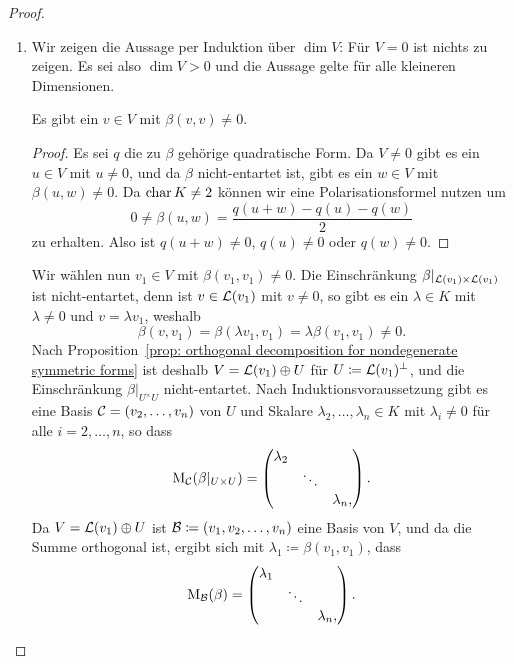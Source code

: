\documentclass[a4paper,10pt,numbers=noenddot]{scrartcl}
\begin{document}
\begin{proof}
  \begin{enumerate}[leftmargin=*]
    \item
      Wir zeigen die Aussage per Induktion über $\dim V$:
      Für $V = 0$ ist nichts zu zeigen.
      Es sei also $\dim V > 0$ und die Aussage gelte für alle kleineren Dimensionen.
      
      \begin{claim}
        Es gibt ein $v \in V$ mit $\beta(v,v) \neq 0$.
      \end{claim}
      \begin{proof}
        Es sei $q$ die zu $\beta$ gehörige quadratische Form.
        Da $V \neq 0$ gibt es ein $u \in V$ mit $u \neq 0$, und da $\beta$ nicht-entartet ist, gibt es ein $w \in V$ mit $\beta(u,w) \neq 0$.
        Da $\operatorname{char} K \neq 2$ können wir eine Polarisationsformel nutzen um
        \[
                0 
          \neq  \beta(u,w)
          =     \frac{q(u+w)-q(u)-q(w)}{2}
        \]
        zu erhalten.
        Also ist $q(u+w) \neq 0$, $q(u) \neq 0$ oder $q(w) \neq 0$.
      \end{proof}
    
      Wir wählen nun $v_1 \in V$ mit $\beta(v_1,v_1) \neq 0$.
      Die Einschränkung $\beta|_{\operatorname{\mathcal{L}}(v_1) \times \operatorname{\mathcal{L}}(v_1)}$ ist nicht-entartet, denn ist $v \in \operatorname{\mathcal{L}}(v_1)$ mit $v \neq 0$, so gibt es ein $\lambda \in K$ mit $\lambda \neq 0$ und $v = \lambda v_1$, weshalb
      \[
              \beta(v, v_1)
        =     \beta(\lambda v_1, v_1)
        =     \lambda \beta(v_1, v_1)
        \neq  0.
      \]
      Nach Proposition~\ref{prop: orthogonal decomposition for nondegenerate symmetric forms} ist deshalb $V = \operatorname{\mathcal{L}}(v_1) \oplus U$ für $U \coloneqq \operatorname{\mathcal{L}}(v_1)^\perp$, und die Einschränkung $\beta|_{U^ \times U}$ nicht-entartet.
      Nach Induktionsvoraussetzung gibt es eine Basis $\mathcal{C} = (v_2, \dotsc, v_n)$ von $U$ und Skalare $\lambda_2, \dotsc, \lambda_n \in K$ mit $\lambda_i \neq 0$ für alle $i = 2, \dotsc, n$, so dass
      \[
        \operatorname{M}_{\mathcal{C}}(\beta|_{U \times U})
        =
        \begin{pmatrix}
          \lambda_2 &         &           \\
                    & \ddots  &           \\
                    &         & \lambda_n,
        \end{pmatrix}.
      \]
      Da $V = \operatorname{\mathcal{L}}(v_1) \oplus U$ ist $\mathcal{B} \coloneqq (v_1, v_2, \dotsc, v_n)$ eine Basis von $V$, und da die Summe orthogonal ist, ergibt sich mit $\lambda_1 \coloneqq \beta(v_1, v_1)$, dass
      \[
        \operatorname{M}_{\mathcal{B}}(\beta)
        =
        \begin{pmatrix}
          \lambda_1 &         &           \\
                    & \ddots  &           \\
                    &         & \lambda_n,
        \end{pmatrix}.
      \]
      

\end{enumerate}
\end{proof}
\end{document}
